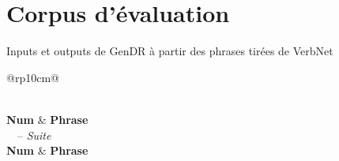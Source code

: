 
\chapter{Corpus d'évaluation}

Inputs et outputs de GenDR à partir des phrases tirées de VerbNet

\iffalse 
\begin{longtable}{@{}rp{10cm}@{}}
\caption{Phrases tirées de VerbNet pour l'évaluation}\\
\toprule
\textbf{Num} & \textbf{Phrase} \\
\midrule
\endfirsthead
{}%
{\tablename\ \thetable\ -- \textit{Suite}} \\
\toprule
\textbf{Num} & \textbf{Phrase} \\
\midrule
\endhead
\bottomrule {} \\
\endfoot
\bottomrule
\endlastfoot


\end{longtable}
